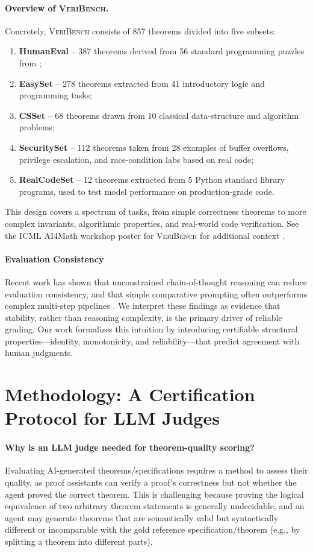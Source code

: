 \documentclass[numbers]{article}
\begin{document}
\paragraph{Overview of \textsc{VeriBench}.}
Concretely, \textsc{VeriBench} consists of 857 theorems divided into five subsets:
\begin{enumerate}
  \item \textbf{HumanEval} – 387 theorems derived from 56 standard programming puzzles from \citet{chen2021evaluating};
  \item \textbf{EasySet} – 278 theorems extracted from 41 introductory logic and programming tasks;
  \item \textbf{CSSet} – 68 theorems drawn from 10 classical data-structure and algorithm problems;
  \item \textbf{SecuritySet} – 112 theorems taken from 28 examples of buffer overflows, privilege escalation, and race-condition labs based on real code;
  \item \textbf{RealCodeSet} – 12 theorems extracted from 5 Python standard library programs, used to test model performance on production-grade code.
\end{enumerate}
This design covers a spectrum of tasks, from simple correctness theorems to more complex invariants, algorithmic properties, and real-world code verification. See the ICML AI4Math workshop poster for \textsc{VeriBench} for additional context \citep{veribench_icml25}.

\paragraph{Evaluation Consistency}

Recent work has shown that unconstrained chain-of-thought reasoning can reduce evaluation consistency, and that simple comparative prompting often outperforms complex multi-step pipelines \cite{chen2026rethinking}. We interpret these findings as evidence that stability, rather than reasoning complexity, is the primary driver of reliable grading. Our work formalizes this intuition by introducing certifiable structural properties---identity, monotonicity, and reliability---that predict agreement with human judgments.

\section{Methodology: A Certification Protocol for LLM Judges}

\paragraph{Why is an LLM judge needed for theorem-quality scoring?}
Evaluating AI-generated theorems/specifications requires a method to assess their quality, as proof assistants can verify a proof's correctness but not whether the agent proved the correct theorem.
This is challenging because proving the logical equivalence of two arbitrary theorem statements is generally undecidable, and an agent may generate theorems that are semantically valid but syntactically different or incomparable with the gold reference specification/theorem (e.g., by splitting a theorem into different parts).
\end{document}

